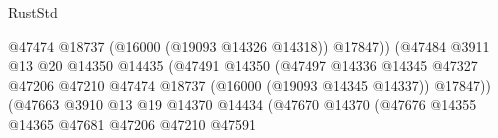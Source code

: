 \begin{lexlean}{RustStd}
\begin{coremodule}
                                                              @47474
                                                              @18737
                                                              (@16000 (@19093 @14326 @14318))
                                                              @17847))
                                                          (@47484
                                                            @3911
                                                            @13
                                                            @20
                                                            @14350
                                                            @14435
                                                            (@47491
                                                              @14350
                                                              (@47497
                                                                @14336
                                                                @14345
                                                                @47327
                                                                @47206
                                                                @47210
                                                                @47474
                                                                @18737
                                                                (@16000 (@19093 @14345 @14337))
                                                                @17847))
                                                            (@47663
                                                              @3910
                                                              @13
                                                              @19
                                                              @14370
                                                              @14434
                                                              (@47670
                                                                @14370
                                                                (@47676
                                                                  @14355
                                                                  @14365
                                                                  @47681
                                                                  @47206
                                                                  @47210
                                                                  @47591

\end{coremodule}
\end{lexlean}
